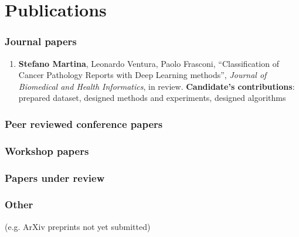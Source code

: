 \chapter{Publications}
\label{app:publications}

\subsection*{Journal papers}
\begin{enumerate}
\item \textbf{Stefano Martina}, Leonardo Ventura, Paolo Frasconi,
  ``Classification of Cancer Pathology Reports with Deep Learning
  methods'', \textit{Journal of Biomedical and Health Informatics}, in
  review.
  \textbf{Candidate's contributions}: prepared dataset, designed
  methods and experiments, designed algorithms
\end{enumerate}
\subsection*{Peer reviewed conference papers}
\subsection*{Workshop papers}
\subsection*{Papers under review}
\subsection*{Other}
(e.g. ArXiv preprints not yet submitted)


